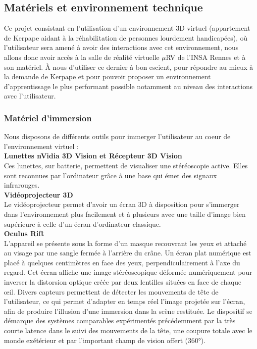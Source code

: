 \subsection{Matériels et environnement technique}

Ce projet consistant en l'utilisation d'un environnement 3D virtuel (appartement de Kerpape aidant à la réhabilitation de personnes lourdement handicapées), où l'utilisateur sera amené à avoir des interactions avec cet environnement, nous allons donc avoir accès à la salle de réalité virtuelle $\mu$RV de l'INSA Rennes et à son matériel. \`A nous d'utiliser ce dernier à bon escient, pour répondre au mieux à la demande de Kerpape et pour pouvoir proposer un environnement d'apprentissage le plus performant possible notamment au niveau des interactions avec l'utilisateur.

\subsubsection{Matériel d'immersion}
Nous disposons de différents outils pour immerger l'utilisateur au coeur de l'environnement virtuel :
\\

\textbf{Lunettes nVidia 3D Vision et Récepteur 3D Vision}
\\

Ces lunettes, sur batterie, permettent de visualiser une stéréoscopie active. Elles sont reconnues par l'ordinateur grâce à une base qui émet des signaux infrarouges.
\\

\textbf{Vidéoprojecteur 3D}
\\

Le vidéoprojecteur permet d'avoir un écran 3D à disposition pour s'immerger dans l'environnement plus facilement et à plusieurs avec une taille d'image bien supérieure à celle d'un écran d'ordinateur classique.
\\


\textbf{Oculus Rift}
\\

L'appareil se présente sous la forme d'un masque recouvrant les yeux et attaché au visage par une sangle fermée à l'arrière du crâne. Un écran plat numérique est placé à quelques centimètres en face des yeux, perpendiculairement à l'axe du regard. Cet écran affiche une image stéréoscopique déformée numériquement pour inverser la distorsion optique créée par deux lentilles situées en face de chaque œil. Divers capteurs permettent de détecter les mouvements de tête de l'utilisateur, ce qui permet d'adapter en temps réel l'image projetée sur l'écran, afin de produire l'illusion d'une immersion dans la scène restituée.
Le dispositif se démarque des systèmes comparables expérimentés précédemment par la très courte latence dans le suivi des mouvements de la tête, une coupure totale avec le monde exétérieur et par l'important champ de vision offert (360°).
\\

